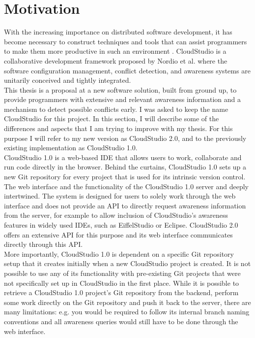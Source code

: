 \section{Motivation}




With the increasing importance on distributed software development, it has become necessary to construct techniques and tools that can assist programmers to make them more productive in such an environment \cite{ref13}. CloudStudio is a collaborative development framework proposed by Nordio et al. \cite{ref12, ref28} where the software configuration management, conflict detection, and awareness systems are unitarily conceived and tightly integrated. \\

This thesis is a proposal at a new software solution, built from ground up, to provide programmers with extensive and relevant awareness information and a mechanism to detect possible conflicts early. I was asked to keep the name CloudStudio for this project. In this section, I will describe some of the differences and aspects that I am trying to improve with my thesis. For this purpose I will refer to my new version as CloudStudio 2.0, and to the previously existing implementation as CloudStudio 1.0. \\

CloudStudio 1.0 is a web-based IDE that allows users to work, collaborate and run code directly in the browser. Behind the curtains, CloudStudio 1.0 sets up a new Git repository for every project that is used for its intrinsic version control. \\

The web interface and the functionality of the CloudStudio 1.0 server and deeply intertwined. The system is designed for users to solely work through the web interface and does not provide an API to directly request awareness information from the server, for example to allow inclusion of CloudStudio's awareness features in widely used IDEs, such as EiffelStudio \cite{eiffelstudio} or Eclipse. CloudStudio 2.0 offers an extensive API for this purpose and its web interface communicates directly through this API. \\

More importantly, CloudStudio 1.0 is dependent on a specific Git repository setup that it creates initially when a new CloudStudio project is created. It is not possible to use any of its functionality with pre-existing Git projects that were not specifically set up in CloudStudio in the first place. While it is possible to retrieve a CloudStudio 1.0 project's Git repository from the backend, perform some work directly on the Git repository and push it back to the server, there are many limitations: e.g. you would be required to follow its internal branch naming conventions and all awareness queries would still have to be done through the web interface. \\

